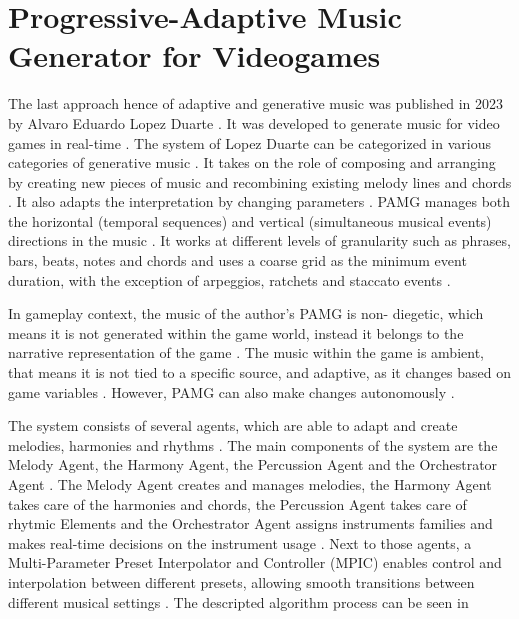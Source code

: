 \section{Progressive-Adaptive Music Generator for Videogames}

The last approach hence of adaptive and generative music
was published in 2023 by Alvaro Eduardo Lopez Duarte \cite{lopez2023progressive}.
It was developed to generate music for 
video games in real-time \cite{lopez2023progressive}.
The system of Lopez Duarte can be categorized in various categories of generative music \cite{lopez2023progressive}. It takes on the role of composing and arranging by creating new pieces of music and recombining existing melody lines and chords \cite{lopez2023progressive}. It also adapts the interpretation by changing parameters \cite{lopez2023progressive}. PAMG manages both the horizontal (temporal sequences) and vertical (simultaneous musical events) directions in the music \cite{lopez2023progressive}. It works at different levels of granularity such as phrases, bars, beats, notes and chords and uses a coarse grid as the minimum event duration, with the exception of arpeggios, ratchets and staccato events \cite{lopez2023progressive}.

In gameplay context, the music of the author's PAMG is non-
diegetic, which means it is not generated within the game 
world,
instead it belongs to the narrative representation of the
game \cite{lopez2023progressive}. The music within the game is ambient, that means it is
not tied to a specific source, and adaptive, as it changes 
based on game variables \cite{lopez2023progressive}. However, PAMG can also make changes
autonomously \cite{lopez2023progressive}.

The system consists of several agents, which are able to
adapt and create melodies, harmonies and rhythms 
\cite{lopez2023progressive}. The main components of 
the system are the Melody Agent, the Harmony Agent, the 
Percussion Agent and the Orchestrator Agent
\cite{lopez2023progressive}. The Melody Agent creates
and manages melodies, the Harmony Agent takes care of
the harmonies and chords, the Percussion Agent takes care
of rhytmic Elements and the Orchestrator Agent assigns
instruments families and makes real-time decisions on the
instrument usage \cite{lopez2023progressive}. Next to those
agents, a Multi-Parameter Preset Interpolator and Controller
(MPIC) enables control and interpolation between different 
presets, allowing smooth transitions between different 
musical settings \cite{lopez2023progressive}. The descripted
algorithm process can be seen in 

